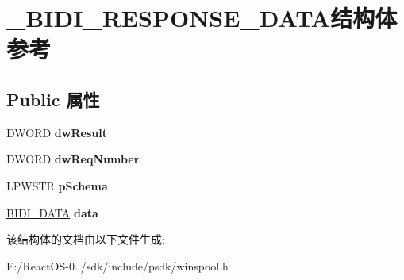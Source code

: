 \hypertarget{struct___b_i_d_i___r_e_s_p_o_n_s_e___d_a_t_a}{}\section{\+\_\+\+B\+I\+D\+I\+\_\+\+R\+E\+S\+P\+O\+N\+S\+E\+\_\+\+D\+A\+T\+A结构体 参考}
\label{struct___b_i_d_i___r_e_s_p_o_n_s_e___d_a_t_a}
\subsection*{Public 属性}
\begin{DoxyCompactItemize}
\item 
\mbox{\label{struct___b_i_d_i___r_e_s_p_o_n_s_e___d_a_t_a_ac110772e54b999c11da829eb7704f811}} 
D\+W\+O\+RD {\bfseries dw\+Result}
\item 
\mbox{\label{struct___b_i_d_i___r_e_s_p_o_n_s_e___d_a_t_a_a1de170e3d6d995d351c412ba332044fa}} 
D\+W\+O\+RD {\bfseries dw\+Req\+Number}
\item 
\mbox{\label{struct___b_i_d_i___r_e_s_p_o_n_s_e___d_a_t_a_ab8795aea983e15627c8bd9614aa64979}} 
L\+P\+W\+S\+TR {\bfseries p\+Schema}
\item 
\mbox{\label{struct___b_i_d_i___r_e_s_p_o_n_s_e___d_a_t_a_a651adedfb7304965ccfbb9e3c5638bea}} 
\hyperlink{struct___b_i_d_i___d_a_t_a}{B\+I\+D\+I\+\_\+\+D\+A\+TA} {\bfseries data}
\end{DoxyCompactItemize}


该结构体的文档由以下文件生成\+:\begin{DoxyCompactItemize}
\item 
E\+:/\+React\+O\+S-\/0../sdk/include/psdk/winspool.\+h\end{DoxyCompactItemize}
